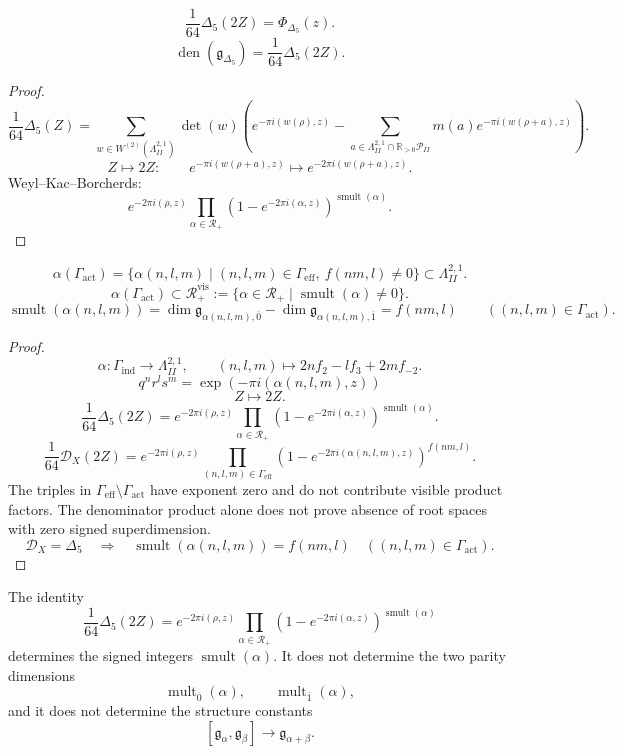 \documentclass[11pt]{memoir}
\newcommand{\R}{\mathbb{R}} \newcommand{\La}{\Lambda}
\newcommand{\Poly}{\mathcal{P}}
\newcommand{\rootmult}{\operatorname{mult}}
\newcommand{\smult}{\operatorname{smult}}
\newcommand{\autcor}{\mathfrak{g}_{\Delta_5}}
\begin{document}
\begin{theorem}
$$\frac{1}{64}\Delta_5(2Z)=\Phi_{\Delta_5}(z).$$
$$\operatorname{den}(\autcor)=\frac1{64}\Delta_5(2Z).$$
\end{theorem}

\begin{proof}
$$\frac1{64}\Delta_5(Z)
=\sum_{w\in W^{(2)}(\La^{2,1}_{II})}\det(w)
\left(
e^{-\pi i(w(\rho),z)}
-\sum_{a\in\La^{2,1}_{II}\cap\R_{>0}\Poly_{II}}
m(a)e^{-\pi i(w(\rho+a),z)}
\right).$$
$$Z\mapsto2Z:\qquad
e^{-\pi i(w(\rho+a),z)}
\mapsto e^{-2\pi i(w(\rho+a),z)}.$$
Weyl--Kac--Borcherds:
$$e^{-2\pi i(\rho,z)}
\prod_{\alpha\in\mathcal R_+}
\left(1-e^{-2\pi i(\alpha,z)}\right)^{\smult(\alpha)}.$$
\end{proof}

\begin{proposition}
$$\alpha(\Gamma_{\mathrm{act}})
=\{\alpha(n,l,m)\mid(n,l,m)\in\Gamma_{\mathrm{eff}},\ f(nm,l)\neq0\}
\subset\La^{2,1}_{II}.$$
$$
\alpha(\Gamma_{\mathrm{act}})
\subset
\mathcal R_+^{\mathrm{vis}}
:=\{\alpha\in\mathcal R_+\mid \smult(\alpha)\neq0\}.
$$
$$\smult(\alpha(n,l,m))
=\dim\mathfrak{g}_{\alpha(n,l,m),\overline0}
-\dim\mathfrak{g}_{\alpha(n,l,m),\overline1}
=f(nm,l)\qquad((n,l,m)\in\Gamma_{\mathrm{act}}).$$
\end{proposition}

\begin{proof}
$$\alpha:\Gamma_{\mathrm{ind}}\to\La^{2,1}_{II},\qquad
(n,l,m)\mapsto2nf_2-lf_3+2mf_{-2}.$$
$$q^nr^ls^m=\exp(-\pi i(\alpha(n,l,m),z))$$
$$Z\mapsto2Z.$$
$$\frac1{64}\Delta_5(2Z)
=e^{-2\pi i(\rho,z)}
\prod_{\alpha\in\mathcal R_+}
\left(1-e^{-2\pi i(\alpha,z)}\right)^{\smult(\alpha)}.$$
$$\frac1{64}\mathcal D_X(2Z)
=e^{-2\pi i(\rho,z)}
\prod_{(n,l,m)\in\Gamma_{\mathrm{eff}}}
\left(1-e^{-2\pi i(\alpha(n,l,m),z)}\right)^{f(nm,l)}.$$
The triples in $\Gamma_{\mathrm{eff}}\setminus\Gamma_{\mathrm{act}}$
have exponent zero and do not contribute visible product factors.  The
denominator product alone does not prove absence of root spaces with
zero signed superdimension.
$$\mathcal D_X=\Delta_5\quad\Longrightarrow\quad
\smult(\alpha(n,l,m))=f(nm,l)
\quad((n,l,m)\in\Gamma_{\mathrm{act}}).$$
\end{proof}

\begin{proposition}
The identity
$$
\frac1{64}\Delta_5(2Z)
=e^{-2\pi i(\rho,z)}
\prod_{\alpha\in\mathcal R_+}
\left(1-e^{-2\pi i(\alpha,z)}\right)^{\smult(\alpha)}
$$
determines the signed integers $\smult(\alpha)$.  It does not determine
the two parity dimensions
$$
\rootmult_{\overline0}(\alpha),\qquad
\rootmult_{\overline1}(\alpha),
$$
and it does not determine the structure constants
$$
[\mathfrak g_\alpha,\mathfrak g_\beta]\to
\mathfrak g_{\alpha+\beta}.
$$
\end{proposition}
\end{document}
